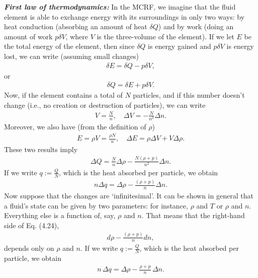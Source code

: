 \documentclass[12pt]{book}
\begin{document}
    \textit{\textbf{First law of thermodynamics:}}
    In the MCRF, we imagine that the fluid element is able to exchange energy with its surroundings in only two ways: by heat conduction (absorbing an amount of heat \(\delta Q\)) and by work (doing an amount of work \(p \delta V\), where \(V\) is the three-volume of the element). If we let \(E\) be the total energy of the element, then since \(\delta Q\) is energy gained and \(p \delta V\) is energy lost, we can write (assuming small changes)
    \begin{align}
    \delta E = \delta Q - p \delta V,
    \end{align}
    or
    \begin{align}
    \delta Q = \delta E + p \delta V.
    \tag{4.22}
    \end{align}
    Now, if the element contains a total of \(N\) particles, and if this number doesn’t change (i.e., no creation or destruction of particles), we can write
    \begin{align}
    V = \frac{N}{n}, \quad \Delta V = -\frac{N}{n^2} \Delta n. \tag{4.23}
    \end{align}
    Moreover, we also have (from the definition of \(\rho\))
    \begin{align}
    E = \rho V = \frac{\rho N}{n}, \quad \Delta E = \rho \Delta V + V \Delta \rho.
    \end{align}
    These two results imply
    \begin{align}
    \Delta Q = \frac{N}{n} \Delta \rho - \frac{N(\rho + p)}{n^2} \Delta n.
    \end{align}
    If we write \(q := \frac{Q}{N}\), which is the heat absorbed per particle, we obtain
    \begin{align}
    n \Delta q = \Delta \rho - \frac{(\rho + p)}{n} \Delta n. \tag{4.24}
    \end{align}
    Now suppose that the changes are ‘infinitesimal’. It can be shown in general that a fluid’s state can be given by two parameters: for instance, \(\rho\) and \(T\) or \(\rho\) and \(n\). Everything else is a function of, say, \(\rho\) and \(n\). That means that the right-hand side of Eq. (4.24),
    \begin{align}
    d\rho - \frac{(\rho + p)}{n} dn,
    \end{align}
    depends only on \(\rho\) and \(n\). If we write \( q := \frac{Q}{N} \), which is the heat absorbed per particle, we obtain
    \begin{align}
    n \, \Delta q = \Delta \rho - \frac{\rho + p}{n} \, \Delta n. \tag{4.24}
    \end{align}
\end{document}
